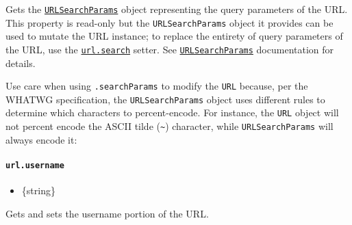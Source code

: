 Gets the \hyperref[class-urlsearchparams]{\texttt{URLSearchParams}}
object representing the query parameters of the URL. This property is
read-only but the \texttt{URLSearchParams} object it provides can be
used to mutate the URL instance; to replace the entirety of query
parameters of the URL, use the \hyperref[urlsearch]{\texttt{url.search}}
setter. See \hyperref[class-urlsearchparams]{\texttt{URLSearchParams}}
documentation for details.

Use care when using \texttt{.searchParams} to modify the \texttt{URL}
because, per the WHATWG specification, the \texttt{URLSearchParams}
object uses different rules to determine which characters to
percent-encode. For instance, the \texttt{URL} object will not percent
encode the ASCII tilde (\texttt{\textasciitilde{}}) character, while
\texttt{URLSearchParams} will always encode it:

\begin{Shaded}
\begin{Highlighting}[]
\OperatorTok{=}  \NormalTok{(}\NormalTok{)}\OperatorTok{;}

\NormalTok{)}\OperatorTok{;}  

\NormalTok{()}\OperatorTok{;}

\NormalTok{)}\OperatorTok{;}  
\end{Highlighting}
\end{Shaded}

\paragraph{\texorpdfstring{\texttt{url.username}}{url.username}}\label{url.username}

\begin{itemize}
\tightlist
\item
  \{string\}
\end{itemize}

Gets and sets the username portion of the URL.

